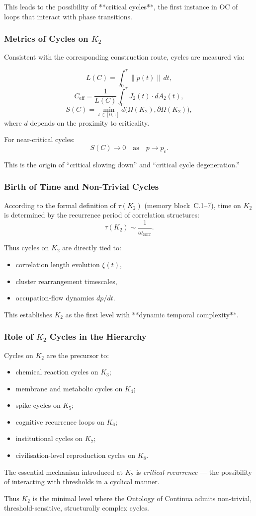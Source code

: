This leads to the possibility of **critical cycles**, the first instance
in OC of loops that interact with phase transitions.

\subsubsection{Metrics of Cycles on \texorpdfstring{$K_2$}{K_2}}

Consistent with the corresponding construction route, cycles are measured via:

\[
  L(C)
  = \int_0^\tau \|\dot{p}(t)\|\, dt,
\]
\[
  C_{\mathrm{eff}}
  = \frac{1}{L(C)} \int_0^\tau J_2(t)\cdot dA_2(t),
\]
\[
  S(C) = \min_{t\in[0,\tau]} d\bigl(\Omega(K_2),\partial\Omega(K_2)\bigr),
\]
where $d$ depends on the proximity to criticality.

For near-critical cycles:
\[
  S(C) \to 0 \quad \text{as} \quad p\to p_c.
\]

This is the origin of ``critical slowing down'' and ``critical cycle
degeneration.''

\subsubsection{Birth of Time and Non-Trivial Cycles}

According to the formal definition of $\tau(K_2)$ (memory block~C.1–7),
time on $K_2$ is determined by the recurrence period of correlation
structures:
\[
  \tau(K_2) \sim \frac{1}{\omega_{\mathrm{corr}}}.
\]

Thus cycles on $K_2$ are directly tied to:

\begin{itemize}
  \item correlation length evolution $\xi(t)$,
  \item cluster rearrangement timescales,
  \item occupation-flow dynamics $dp/dt$.
\end{itemize}

This establishes $K_2$ as the first level with **dynamic temporal
complexity**.

\subsubsection{Role of \texorpdfstring{$K_2$}{K_2} Cycles in the Hierarchy}

Cycles on $K_2$ are the precursor to:

\begin{itemize}
  \item chemical reaction cycles on $K_3$;
  \item membrane and metabolic cycles on $K_4$;
  \item spike cycles on $K_5$;
  \item cognitive recurrence loops on $K_6$;
  \item institutional cycles on $K_7$;
  \item civilisation-level reproduction cycles on $K_8$.
\end{itemize}

The essential mechanism introduced at $K_2$ is \emph{critical recurrence}
— the possibility of interacting with thresholds in a cyclical manner.

Thus $K_2$ is the minimal level where the Ontology of Continua admits
non-trivial, threshold-sensitive, structurally complex cycles.
